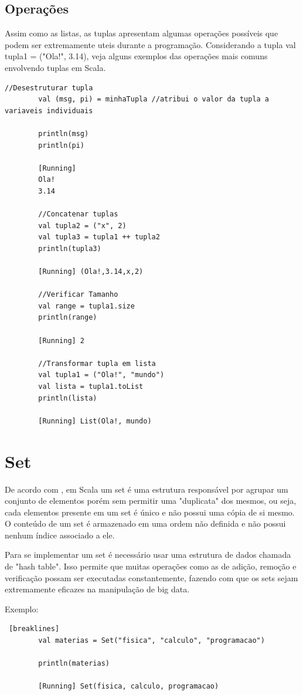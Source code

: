 	\subsection{Operações}
	Assim como as listas, as tuplas apresentam algumas operações possíveis que podem ser extremamente uteis durante a programação. Considerando a tupla val tupla1 = ("Ola!", 3.14), veja alguns exemplos das operações mais comuns envolvendo tuplas em Scala.
	
	\begin{lstlisting}[breaklines]
		//Desestruturar tupla
		val (msg, pi) = minhaTupla //atribui o valor da tupla a variaveis individuais
		
		println(msg)
		println(pi)
		
		[Running] 
		Ola!
		3.14
		
		//Concatenar tuplas
		val tupla2 = ("x", 2)
		val tupla3 = tupla1 ++ tupla2
		println(tupla3)
		
		[Running] (Ola!,3.14,x,2)
		
		//Verificar Tamanho
		val range = tupla1.size
		println(range)
		
		[Running] 2
		
		//Transformar tupla em lista
		val tupla1 = ("Ola!", "mundo")
		val lista = tupla1.toList
		println(lista)
		
		[Running] List(Ola!, mundo)
	\end{lstlisting}


    \section{Set}

	De acordo com \cite{Odersky}, em Scala um set é uma estrutura responsável por agrupar um conjunto de elementos porém sem permitir uma "duplicata" dos mesmos, ou seja, cada elementos presente em um set é único e não possui uma cópia de si mesmo. O conteúdo de um set é armazenado em uma ordem não definida e não possui nenhum índice associado a ele.
	
	Para se implementar um set é necessário usar uma estrutura de dados chamada de "hash table". Isso permite que muitas operações como as de adição, remoção e verificação possam ser executadas constantemente, fazendo com que os sets sejam extremamente eficazes na manipulação de big data.
	
	Exemplo:
	
	\begin{lstlisting} [breaklines]
		val materias = Set("fisica", "calculo", "programacao")
		
		println(materias)
		
		[Running] Set(fisica, calculo, programacao)
	\end{lstlisting}

